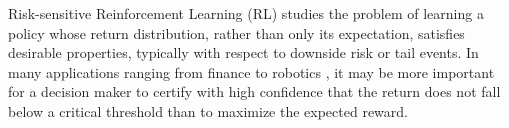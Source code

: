 \documentclass[final,12pt]{colt2026} %
\begin{document}



Risk-sensitive Reinforcement Learning (RL) studies the problem of learning a policy whose return distribution, rather than only its expectation, satisfies desirable properties, typically with respect to downside risk or tail events. In many applications ranging from finance to robotics \citep{charpentier2021reinforcement,polydoros2017survey}, it may be more important for a decision maker to certify with high confidence that the return does not fall below a critical threshold than to maximize the expected reward.
\end{document}
